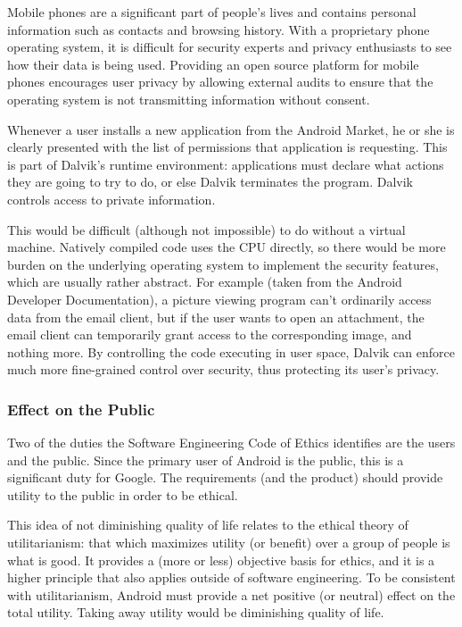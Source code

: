 \documentclass[11pt]{article}
\begin{document}
\begin{multicols}{2}
Mobile phones are a significant part of people's lives and contains personal
information such as contacts and browsing history.  With a proprietary phone
operating system, it is difficult for security experts and privacy enthusiasts
to see how their data is being used.  Providing an open source platform for
mobile phones encourages user privacy by allowing external audits to ensure that
the operating system is not transmitting information without consent.

Whenever a user installs a new application from the Android Market, he or she is
clearly presented with the list of permissions that application is requesting.
This is part of Dalvik's runtime environment: applications must declare what
actions they are going to try to do, or else Dalvik terminates the program.
Dalvik controls access to private information.

This would be difficult (although not impossible) to do without a virtual
machine.  Natively compiled code uses the CPU directly, so there would be more
burden on the underlying operating system to implement the security features,
which are usually rather abstract.  For example (taken from the Android
Developer Documentation), a picture viewing program can't ordinarily access data
from the email client, but if the user wants to open an attachment, the email
client can temporarily grant access to the corresponding image, and nothing
more.  By controlling the code executing in user space, Dalvik can enforce much
more fine-grained control over security, thus protecting its user's privacy.


\subsubsection{Effect on the Public} %
\label{ssub:public-effect}

Two of the duties the Software Engineering Code of Ethics identifies are the
users and the public.  Since the primary user of Android is the public, this is
a significant duty for Google.  The requirements (and the product) should
provide utility to the public in order to be ethical.

This idea of not diminishing quality of life relates to the ethical theory of
utilitarianism: that which maximizes utility (or benefit) over a group of people
is what is good.  It provides a (more or less) objective basis for ethics, and
it is a higher principle that also applies outside of software engineering.  To
be consistent with utilitarianism, Android must provide a net positive (or
neutral) effect on the total utility.  Taking away utility would be diminishing
quality of life.


\end{multicols}
\end{document}
